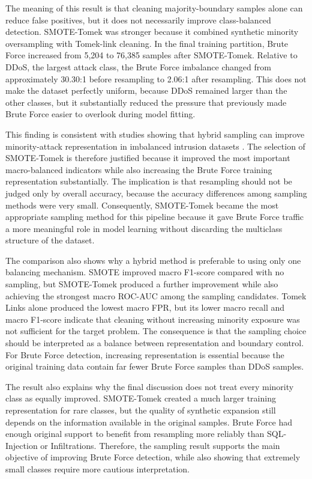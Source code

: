 \documentclass[12pt,a4paper]{article}
\begin{document}
The meaning of this result is that cleaning majority-boundary samples alone can reduce false positives, but it does not necessarily improve class-balanced detection. SMOTE-Tomek was stronger because it combined synthetic minority oversampling with Tomek-link cleaning. In the final training partition, Brute Force increased from 5,204 to 76,385 samples after SMOTE-Tomek. Relative to DDoS, the largest attack class, the Brute Force imbalance changed from approximately 30.30:1 before resampling to 2.06:1 after resampling. This does not make the dataset perfectly uniform, because DDoS remained larger than the other classes, but it substantially reduced the pressure that previously made Brute Force easier to overlook during model fitting.

This finding is consistent with studies showing that hybrid sampling can improve minority-attack representation in imbalanced intrusion datasets \parencite{khan2024balanced,le2024unbalanced,nassreddine2025ensemble,harini2023minority}. The selection of SMOTE-Tomek is therefore justified because it improved the most important macro-balanced indicators while also increasing the Brute Force training representation substantially. The implication is that resampling should not be judged only by overall accuracy, because the accuracy differences among sampling methods were very small. Consequently, SMOTE-Tomek became the most appropriate sampling method for this pipeline because it gave Brute Force traffic a more meaningful role in model learning without discarding the multiclass structure of the dataset.

The comparison also shows why a hybrid method is preferable to using only one balancing mechanism. SMOTE improved macro F1-score compared with no sampling, but SMOTE-Tomek produced a further improvement while also achieving the strongest macro ROC-AUC among the sampling candidates. Tomek Links alone produced the lowest macro FPR, but its lower macro recall and macro F1-score indicate that cleaning without increasing minority exposure was not sufficient for the target problem. The consequence is that the sampling choice should be interpreted as a balance between representation and boundary control. For Brute Force detection, increasing representation is essential because the original training data contain far fewer Brute Force samples than DDoS samples.

The result also explains why the final discussion does not treat every minority class as equally improved. SMOTE-Tomek created a much larger training representation for rare classes, but the quality of synthetic expansion still depends on the information available in the original samples. Brute Force had enough original support to benefit from resampling more reliably than SQL-Injection or Infiltrations. Therefore, the sampling result supports the main objective of improving Brute Force detection, while also showing that extremely small classes require more cautious interpretation.
\end{document}

